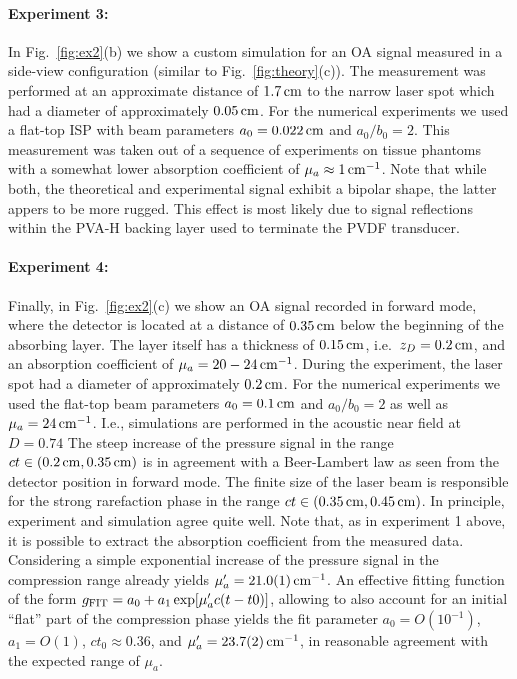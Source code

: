 \documentclass[12pt]{iopart}
\begin{document}
\paragraph{Experiment 3:} In Fig.\ \ref{fig:ex2}(b) we show a custom simulation
for an OA signal measured in a side-view configuration (similar to Fig.\
\ref{fig:theory}(c)). The measurement was performed at an approximate distance
of $1.7\,{\rm{cm}}$ to the narrow laser spot which had a diameter of
approximately $0.05\,{\rm{cm}}$. For the numerical experiments we used a
flat-top ISP with beam parameters $a_0=0.022\,{\rm{cm}}$ and $a_0/b_0=2$. This
measurement was taken out of a sequence of experiments on tissue phantoms with
a somewhat lower absorption coefficient of $\mu_a \approx 1\,{\rm cm}^{-1}$.  
Note that while both, the theoretical and experimental signal exhibit a 
bipolar shape, the latter appers to be more rugged. This effect is most likely 
due to signal reflections within the PVA-H backing layer used to terminate the 
PVDF transducer.

\paragraph{Experiment 4:}
Finally, in Fig.\ \ref{fig:ex2}(c) we show an OA signal recorded in forward
mode, where the detector is located at a distance of $0.35\,{\rm cm}$ below the
beginning of the absorbing layer. The layer itself has a thickness of
$0.15\,{\rm{cm}}$, i.e.\ $z_D=0.2\,{\rm{cm}}$, 
and an absorption coefficient of $\mu_a=20-24\,{\rm cm}^{-1}$.
During the experiment, the laser spot had a diameter of approximately
$0.2\,{\rm cm}$. For the numerical experiments we used the flat-top beam
parameters $a_0=0.1\,{\rm{cm}}$ and $a_0/b_0=2$ as well as
$\mu_a=24\,{\rm{cm}^{-1}}$. I.e., simulations are performed in the acoustic 
near field at $D=0.74$  The steep increase of the pressure signal in the range
$ct \in (0.2\,{\rm cm},0.35\,{\rm cm})$ is in agreement with a Beer-Lambert law
as seen from the detector position in forward mode. The finite size of the
laser beam is responsible for the strong rarefaction phase in the range $ct \in
(0.35\,{\rm cm},0.45\,{\rm cm})$. In principle, experiment and simulation agree
quite well. Note that, as in experiment 1 above, it is possible to extract the
absorption coefficient from the measured data.  Considering a simple
exponential increase of the pressure signal in the compression range already
yields $\mu_a^\prime=21.0(1)\,{\rm cm}^{-1}$. An effective fitting function of
the form $g_{\rm{FIT}}=a_0 + a_1 \exp[\mu_a^\prime c (t-t0)]$, allowing to also
account for an initial ``flat'' part of the compression phase yields the fit
parameter $a_0=O(10^{-1})$, $a_1=O(1)$, $ct_0\approx 0.36$, and
$\mu_a^\prime=23.7(2)\,{\rm cm}^{-1}$, in reasonable agreement with the
expected range of $\mu_a$.
\end{document}
